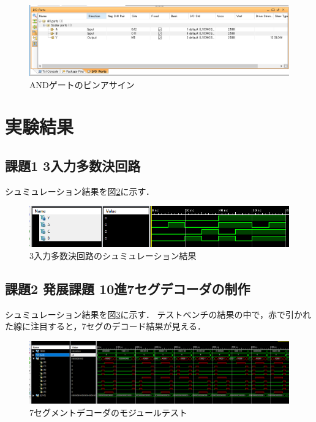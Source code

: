 \begin{figure}[tbp]
  \includegraphics[width=140mm,angle=0]{week2/pics/pinasign.png}
  \centering
   \caption{ANDゲートのピンアサイン} %
   \label{fig:ANDpinasign} %
\end{figure}

\clearpage
\section{実験結果}

\subsection{課題1 3入力多数決回路}
シュミュレーション結果を図\ref{fig:tmrsim}に示す．

\begin{figure}[tbp]
  \includegraphics[width=140mm,angle=0]{week2/pics/TMRsim.png}
  \centering
   \caption{3入力多数決回路のシュミュレーション結果} %
   \label{fig:tmrsim} %
\end{figure}


\subsection{課題2 発展課題 10進7セグデコーダの制作}
シュミュレーション結果を図\ref{fig:schbased7segsim}に示す．
テストベンチの結果の中で，赤で引かれた線に注目すると，7セグのデコード結果が見える．
\begin{figure}[tbp]
  \includegraphics[width=140mm,angle=0]{week2/pics/waveform-7seg.png}
  \centering
   \caption{7セグメントデコーダのモジュールテスト} %
   \label{fig:schbased7segsim} %
\end{figure}


